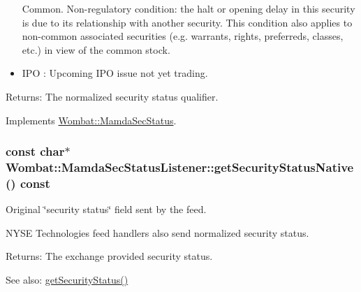 \begin{itemize}
Common. Non-regulatory condition: the halt or opening delay in this security is due to its relationship with another security. This condition also applies to non-common associated securities (e.g. warrants, rights, preferreds, classes, etc.) in view of the common stock. \item IPO : Upcoming IPO issue not yet trading. \end{itemize}


\begin{Desc}
\item[Returns:]The normalized security status qualifier. \end{Desc}


Implements \hyperlink{classWombat_1_1MamdaSecStatus_c75f88870e36e581ef460d88c0fa4719}{Wombat::Mamda\-Sec\-Status}.\hypertarget{classWombat_1_1MamdaSecStatusListener_9f8513907a453b1f2e5b7fad4f6c8b01}{
\subsubsection[getSecurityStatusNative]{\setlength{\rightskip}{0pt plus 5cm}const char$\ast$ Wombat::Mamda\-Sec\-Status\-Listener::get\-Security\-Status\-Native () const}}
\label{classWombat_1_1MamdaSecStatusListener_9f8513907a453b1f2e5b7fad4f6c8b01}


Original \char`\"{}security status\char`\"{} field sent by the feed. 

NYSE Technologies feed handlers also send normalized security status.

\begin{Desc}
\item[Returns:]The exchange provided security status. \end{Desc}
\begin{Desc}
\item[See also:]\hyperlink{classWombat_1_1MamdaSecStatusListener_b1b6d523017888af27f4c3745c2e7fc0}{get\-Security\-Status()} \end{Desc}


